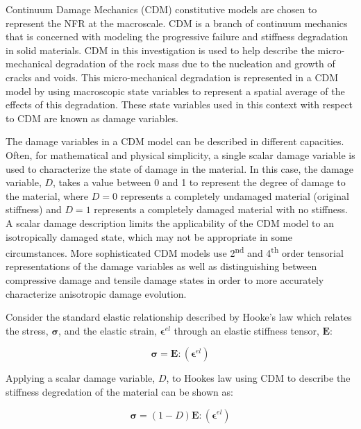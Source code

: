 Continuum Damage Mechanics (CDM) constitutive models are chosen to represent the NFR at the macroscale. CDM is a branch of continuum mechanics that is concerned with modeling the progressive failure and stiffness degradation in solid materials. CDM in this investigation is used to help describe the micro-mechanical degradation of the rock mass due to the nucleation and growth of cracks and voids. This micro-mechanical degradation is represented in a CDM model by using macroscopic state variables to represent a spatial average of the effects of this degradation. These state variables used in this context with respect to CDM are known as damage variables. 

The damage variables in a CDM model can be described in different capacities. Often, for mathematical and physical simplicity, a single scalar damage variable is used to characterize the state of damage in the material. In this case, the damage variable, $D$, takes a value between 0 and 1 to represent the degree of damage to the material, where $D=0$ represents a completely undamaged material (original stiffness) and $D=1$ represents a completely damaged material with no stiffness. A scalar damage description limits the applicability of the CDM model to an isotropically damaged state, which may not be appropriate in some circumstances. More sophisticated CDM models use 2\textsuperscript{nd} and 4\textsuperscript{th} order tensorial representations of the damage variables as well as distinguishing between compressive damage and tensile damage states in order to more accurately characterize anisotropic damage evolution. 

Consider the standard elastic relationship described by Hooke's law which relates the stress, $\boldsymbol{\sigma}$, and the elastic strain, $\boldsymbol{\epsilon}^{el}$ through an elastic stiffness tensor, $\mathbf{E}$:

\begin{equation}
\boldsymbol{\sigma}=\mathbf{E}:\left(\boldsymbol{\epsilon}^{el}\right)
\label{eqn:const1}
\end{equation}

Applying a scalar damage variable, $D$, to Hookes law using CDM to describe the stiffness degredation of the material can be shown as:

\begin{equation}
\boldsymbol{\sigma}=\left(1-D\right)\mathbf{E}:\left(\boldsymbol{\epsilon}^{el}\right)
\label{eqn:const2}
\end{equation}

